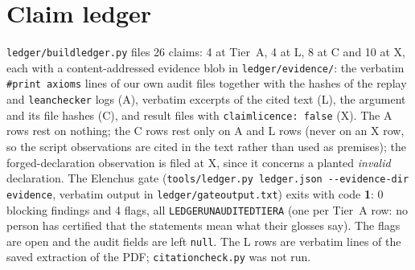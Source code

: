 \documentclass[10pt]{article}
\newcommand{\lean}[1]{\texttt{#1}}
\renewcommand{\_}{\textunderscore\allowbreak}
\begin{document}
\section{Claim ledger}\label{sec:ledger}
\texttt{ledger/build\_ledger.py} files 26 claims: 4 at Tier~A, 4 at L, 8 at C and 10 at X, each with a content-addressed evidence blob in \texttt{ledger/evidence/}: the verbatim \lean{\#print axioms} lines of our own audit files together with the hashes of the replay and \texttt{leanchecker} logs (A), verbatim excerpts of the cited text (L),
the argument and its file hashes (C), and result files with \texttt{claim\_licence: false} (X). The A rows rest on nothing; the C rows rest only on A and L rows (never on an X row, so the script observations are cited in the text rather than used as premises); the forged-declaration observation is filed at X, since it concerns a planted \emph{invalid} declaration. The Elenchus gate
(\texttt{tools/ledger.py ledger.json -{}-evidence-dir evidence}, verbatim output in \texttt{ledger/gate\_output.txt}) exits with code \textbf{1}: 0 blocking findings and 4 flags, all \texttt{LEDGER\_UNAUDITED\_TIER\_A} (one per Tier~A row: no person has certified that the statements mean what their glosses say). The flags are open and the audit fields are left \texttt{null}.
The L rows are verbatim lines of the saved extraction of the PDF; \texttt{citation\_check.py} was not run.
\end{document}
